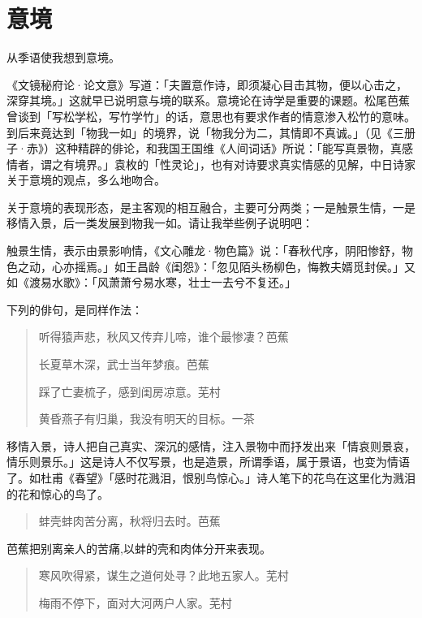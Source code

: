 {    \section*{\FS 意境}

    从季语使我想到意境。

    《文镜秘府论·论文意》写道：「夫置意作诗，即须凝心目击其物，便以心击之，深穿其境。」这就早已说明意与境的联系。意境论在诗学是重要的课题。松尾芭蕉曾谈到「写松学松，写竹学竹」的话，意思也有要求作者的情意渗入松竹的意味。到后来竟达到「物我一如」的境界，说「物我分为二，其情即不真诚。」（见《三册子·赤》）这种精辟的俳论，和我国王国维《人间词话》所说：「能写真景物，真感情者，谓之有境界。」袁枚的「性灵论」，也有对诗要求真实情感的见解，中日诗家关于意境的观点，多么地吻合。

    关于意境的表现形态，是主客观的相互融合，主要可分两类；一是触景生情，一是移情入景，后一类发展到物我一如。请让我举些例子说明吧：

    触景生情，表示由景影响情，《文心雕龙·物色篇》说：「春秋代序，阴阳惨舒，物色之动，心亦摇焉。」如王昌龄《闺怨》：「忽见陌头杨柳色，悔教夫婿觅封侯。」又如《渡易水歌》：「风萧萧兮易水寒，壮士一去兮不复还。」

    下列的俳句，是同样作法：

    \begin{quote}
        听得猿声悲，秋风又传弃儿啼，谁个最惨凄？\hfill 芭蕉

        长夏草木深，武士当年梦痕。\hfill 芭蕉

        踩了亡妻梳子，感到闺房凉意。\hfill 芜村

        黄昏燕子有归巢，我没有明天的目标。\hfill 一茶
    \end{quote}

    移情入景，诗人把自己真实、深沉的感情，注入景物中而抒发出来「情哀则景哀，情乐则景乐。」这是诗人不仅写景，也是造景，所谓季语，属于景语，也变为情语了。如杜甫《春望》「感时花溅泪，恨别鸟惊心。」诗人笔下的花鸟在这里化为溅泪的花和惊心的鸟了。

    \begin{quote}
        蚌壳蚌肉苦分离，秋将归去时。\hfill 芭蕉
    \end{quote}

    芭蕉把别离亲人的苦痛,以蚌的壳和肉体分开来表现。

    \begin{quote}
        寒风吹得紧，谋生之道何处寻？此地五家人。\hfill 芜村

        梅雨不停下，面对大河两户人家。\hfill 芜村
    \end{quote}

}

